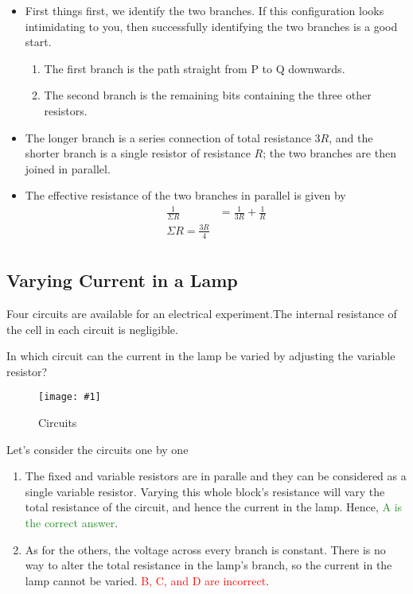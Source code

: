 \documentclass[a4paper,12pt]{article}
\newcommand{\img}[4]{\begin{center}
  \begin{figure}[H]
    \centering
    \texttt{[image: \#1]}
    \caption{#3}
    \label{fig:#4}
  \end{figure}
\end{center}}
\begin{document}
\begin{itemize}
  \item First things first, we identify the two branches. If this configuration looks intimidating to you, then successfully identifying the two branches is a good start.
        \begin{enumerate}
          \item The first branch is the path straight from P to Q downwards.
          \item The second branch is the remaining bits containing the three other resistors.
        \end{enumerate}
  \item The longer branch is a series connection of total resistance $3R$, and the shorter branch is a single resistor of resistance $R$; the two branches are then joined in parallel.
  \item The effective resistance of the two branches in parallel is given by \begin{align*}
          \frac{1}{\Sigma R} & = \frac{1}{3R} + \frac{1}{R} \\
          \Sigma R = \frac{3R}{4}                           \\
        \end{align*}
\end{itemize}

\pagebreak

\subsection{Varying Current in a Lamp}

Four circuits are available for an electrical experiment.The internal resistance of the cell in each circuit is negligible.

In which circuit can the current in the lamp be varied by adjusting the variable resistor?

\img{ex/2.png}{0.8}{Circuits}{ex2}

Let's consider the circuits one by one

\begin{enumerate}[label=\Alph*.]
  \item The fixed and variable resistors are in paralle and they can be considered as a single variable resistor. Varying this whole block's resistance will vary the total resistance of the circuit, and hence the current in the lamp. Hence, \textcolor{ForestGreen}{A is the correct answer}.
  \item As for the others, the voltage across every branch is constant. There is no way to alter the total resistance in the lamp's branch, so the current in the lamp cannot be varied. \textcolor{Red}{B, C, and D are incorrect}.
\end{enumerate}
\end{document}

